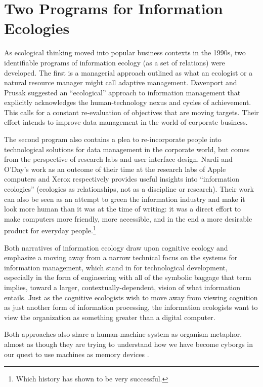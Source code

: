 \section{Two Programs for Information Ecologies}

As ecological thinking moved into popular business contexts in the 1990s, two identifiable programs of information ecology (as a set of relations) were developed. The first is a managerial approach outlined as what an ecologist or a natural resource manager might call adaptive management. Davenport and Prusak suggested an ``ecological'' approach to information management that explicitly acknowledges the human-technology nexus and cycles of achievement. This calls for a constant re-evaluation of objectives that are moving targets. Their effort intends to improve data management in the world of corporate business. 

The second program also contains a plea to re-incorporate people into technological solutions for data management in the corporate world, but comes from the perspective of research labs and user interface design. Nardi and O'Day's work as an outcome of their time at the research labs of Apple computers and Xerox respectively provides useful insights into ``information ecologies'' (ecologies as relationships, not as a discipline or research). Their work can also be seen as an attempt to green the information industry and make it look more human than it was at the time of writing: it was a direct effort to make computers more friendly, more accessible, and in the end a more desirable product for everyday people.\footnote{Which history has shown to be very successful.} 

Both narratives of information ecology draw upon cognitive ecology and emphasize a moving away from a narrow technical focus on the systems for information management, which stand in for technological development, especially in the form of engineering with all of the symbolic baggage that term implies, toward a larger, contextually-dependent, vision of what information entails. Just as the cognitive ecologists wish to move away from viewing cognition as just another form of information processing, the information ecologists want to view the organization as something greater than a digital computer. 

Both approaches also share a human-machine system as organism metaphor, almost as though they are trying to understand how we have become cyborgs in our quest to use machines as memory devices \citep[cf.][]{bowker_2005}.

